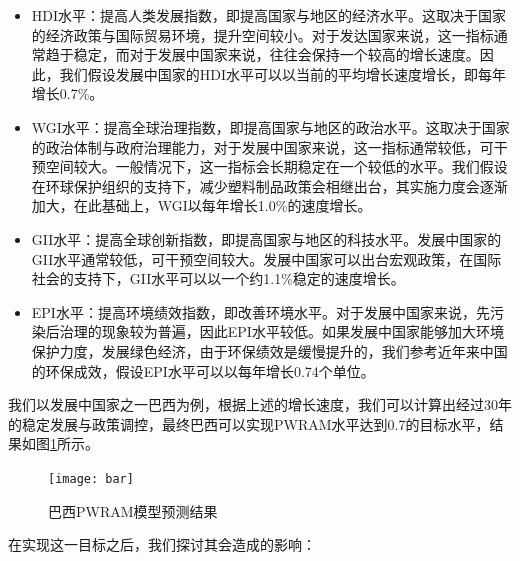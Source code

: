 \documentclass[UTF8, fontset=windows]{mcmthesis}
\begin{document}
\begin{itemize}
  \item HDI水平：提高人类发展指数，即提高国家与地区的经济水平。这取决于国家的经济政策与国际贸易环境，提升空间较小。对于发达国家来说，这一指标通常趋于稳定，而对于发展中国家来说，往往会保持一个较高的增长速度。因此，我们假设发展中国家的HDI水平可以以当前的平均增长速度增长，即每年增长0.7\%。
  \item WGI水平：提高全球治理指数，即提高国家与地区的政治水平。这取决于国家的政治体制与政府治理能力，对于发展中国家来说，这一指标通常较低，可干预空间较大。一般情况下，这一指标会长期稳定在一个较低的水平。我们假设在环球保护组织的支持下，减少塑料制品政策会相继出台，其实施力度会逐渐加大，在此基础上，WGI以每年增长1.0\%的速度增长。
  \item GII水平：提高全球创新指数，即提高国家与地区的科技水平。发展中国家的GII水平通常较低，可干预空间较大。发展中国家可以出台宏观政策，在国际社会的支持下，GII水平可以以一个约1.1\%稳定的速度增长。
  \item EPI水平：提高环境绩效指数，即改善环境水平。对于发展中国家来说，先污染后治理的现象较为普遍，因此EPI水平较低。如果发展中国家能够加大环境保护力度，发展绿色经济，由于环保绩效是缓慢提升的，我们参考近年来中国的环保成效，假设EPI水平可以以每年增长0.74个单位。
\end{itemize}

我们以发展中国家之一巴西为例，根据上述的增长速度，我们可以计算出经过30年的稳定发展与政策调控，最终巴西可以实现PWRAM水平达到0.7的目标水平，结果如图\ref{fig:bar}所示。

\begin{figure}[h]
\centering
\texttt{[image: bar]}
\caption{巴西PWRAM模型预测结果}
\label{fig:bar}
\end{figure}

在实现这一目标之后，我们探讨其会造成的影响：
\end{document}
